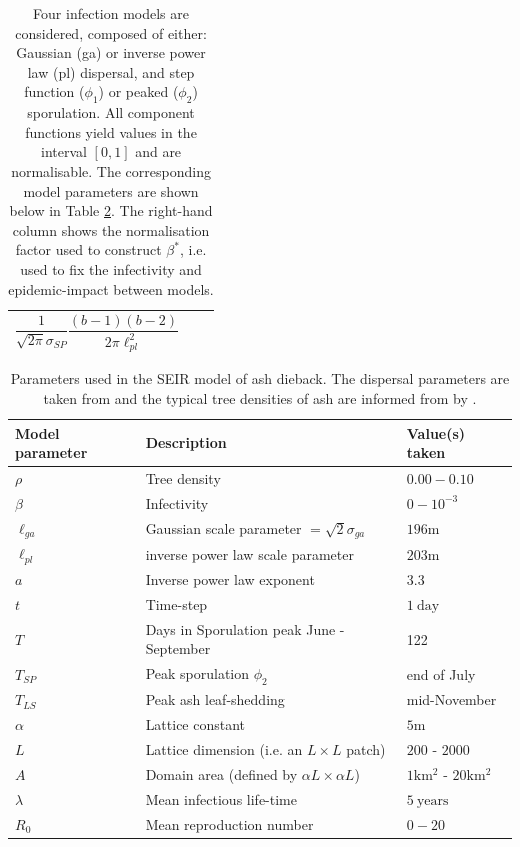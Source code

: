\begin{table}
\begin{tabular}{ m{2.3cm}  m{7cm}  m{} }
\[\frac{1}{\sqrt{2\pi}\sigma_{SP}} \frac{(b-1)(b-2)}{2\pi\ell_{pl}^2}\]
\\
 \hline
 \end{tabular}
  \caption{Four infection models are considered, composed of either: Gaussian (ga) or inverse power law (pl) dispersal, and step function ($\phi_1$) or peaked ($\phi_2$) sporulation. All component functions yield values in the interval $[0, 1]$ and are normalisable. The corresponding model parameters are shown below in Table \ref{tab:SEIR-model}. 
  The right-hand column shows the normalisation factor used to construct $\beta^*$, i.e. used to fix the infectivity and epidemic-impact between models.}
\label{tab:model-variants}
\end{table}

\begin{table}[h]
\centering
\begin{tabular}{l l l}
\hline
\textbf{Model parameter} & \textbf{Description} & \textbf{Value(s) taken}\\
\hline
$\rho$  & Tree density & $0.00 - 0.10$ \\ 
$\beta$ & Infectivity & $0 - 10^{-3}$ \\
$\ell_{ga}$ & Gaussian scale parameter $=\sqrt{2}\sigma_{ga}$ & $196\mathrm{m}$ \\
$\ell_{pl}$ & inverse power law scale parameter & $203\mathrm{m}$ \\
$a$ & Inverse power law exponent & $3.3$ \\
$t$ & Time-step & $1\ \mathrm{day}$\\
$T$ & Days in Sporulation peak June - September & 122  \\
$T_{SP}$ & Peak sporulation $\phi_2$ & end of July \\
$T_{LS}$ & Peak ash leaf-shedding & mid-November \\
$\alpha$ & Lattice constant & $5\mathrm{m}$ \\
$L$ & Lattice dimension (i.e. an $L\times L$ patch)  & $200$ - $2000$ \\
$A$ & Domain area (defined by $\alpha L\times \alpha L$) & $1\mathrm{km^2}$ - $20\mathrm{km^2}$ \\
$\lambda$ & Mean infectious life-time & $5\ \mathrm{years}$ \\
$R_0$ & Mean reproduction number & $0-20$ \\
\hline
\end{tabular}
\caption{Parameters used in the SEIR model of ash dieback. The dispersal parameters are taken from \cite{grosdidier2018tracking} and the typical tree densities of ash are informed from by \cite{hill.data}.}
\label{tab:SEIR-model}
\end{table}

